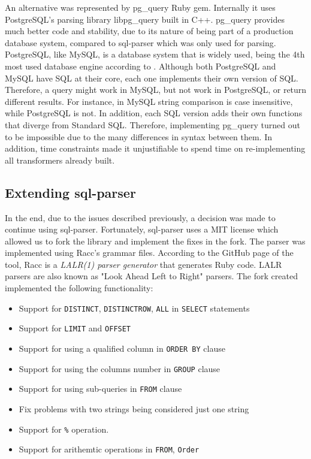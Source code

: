 An alternative was represented by pg\_query Ruby gem. Internally it uses PostgreSQL's parsing library libpg\_query built in C++. pg\_query provides much better code and stability, due to its nature of being part of a production database system, compared to sql-parser which was only used for parsing. PostgreSQL, like MySQL, is a database system that is widely used, being the 4th most used database engine according to \cite{db_engine:statistics}. Although both PostgreSQL and MySQL have SQL at their core, each one implements their own version of SQL. Therefore, a query might work in MySQL, but not work in PostgreSQL, or return different results. For instance, in MySQL string comparison is case insensitive, while PostgreSQL is not. In addition, each SQL version adds their own functions that diverge from Standard SQL. Therefore, implementing pg\_query turned out to be impossible due to the many differences in syntax between them. In addition, time constraints made it unjustifiable to spend time on re-implementing all transformers already built.

\subsection{Extending sql-parser}

In the end, due to the issues described previously, a decision was made to continue using sql-parser. Fortunately, sql-parser uses a MIT license which allowed us to fork the library and implement the fixes in the fork. The parser was implemented using Racc's grammar files. According to the GitHub page of the tool, Racc is a \textit{LALR(1) parser generator} that generates Ruby code. LALR parsers are also known as "Look Ahead Left to Right" parsers. The fork created implemented the following functionality:
\begin{itemize}
    \item Support for \texttt{DISTINCT}, \texttt{DISTINCTROW}, \texttt{ALL} in \texttt{SELECT} statements
    \item Support for \texttt{LIMIT} and \texttt{OFFSET}
    \item Support for using a qualified column in \texttt{ORDER BY} clause
    \item Support for using the columns number in \texttt{GROUP} clause
    \item Support for using sub-queries in \texttt{FROM} clause
    \item Fix problems with two strings being considered just one string
    \item Support for \texttt{\%} operation.
    \item Support for arithemtic operations in \texttt{FROM}, \texttt{Order}
\end{itemize}

